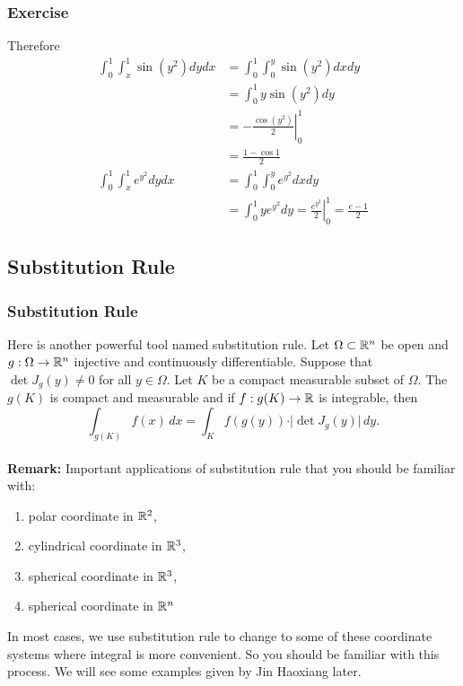 \documentclass[10pt, t]{beamer}
\newcommand{\nullspace}{~\\[15pt]}
\begin{document}
\begin{frame}
    \frametitle{Exercise}
    Therefore
    \[
        \begin{aligned}
            \int_{0}^{1} \int_{x}^{1} \sin \left(y^{2}\right) d y d x & =\int_{0}^{1} \int_{0}^{y} \sin \left(y^{2}\right) d x d y                            \\
                                                                      & =\int_{0}^{1} y \sin \left(y^{2}\right) d y                                           \\&=               -\left.\frac{\cos \left(y^{2}\right)}{2}\right|_{0} ^{1}\\&=\frac{1-\cos 1}{2}          \\
            \int_{0}^{1} \int_{x}^{1} e^{y^{2}} d y d x               & =\int_{0}^{1} \int_{0}^{y} e^{y^{2}} d x d y                                          \\
                                                                      & =\int_{0}^{1} y e^{y^{2}} d y=\left.\frac{e^{y^{2}}}{2}\right|_{0} ^{1}=\frac{e-1}{2}
        \end{aligned}
    \]


\end{frame}

\subsection{Substitution Rule}
\begin{frame}
    \frametitle{Substitution Rule}
    Here is another powerful tool named substitution rule. Let $\Omega\subset\mathbb{R}^n$ be open and $g:\Omega\to\mathbb{R}^n$ injective and continuously differentiable. Suppose that $\det J_g(y)\neq0$ for all $y\in\Omega$. Let $K$ be a compact measurable subset of $\Omega$. The $g(K)$ is compact and measurable and if $f:g(K)\to\mathbb{R}$ is integrable, then
    \[\int_{g(K)}f(x)\,dx=\int_Kf(g(y))\cdot
        \vert\det J_g(y)\vert\,dy.\]
    \nullspace
    \textbf{Remark:} Important applications of substitution rule that you should be familiar with:
    \begin{enumerate}
        \item polar coordinate in $\mathbb{R}^2$,
        \item cylindrical coordinate in $\mathbb{R}^3$,
        \item spherical coordinate in $\mathbb{R}^3$,
        \item spherical coordinate in $\mathbb{R}^n$
    \end{enumerate}
    In most cases, we use substitution rule to change to some of these coordinate systems where integral is more convenient. So you should be familiar with this process. We will see some examples given by Jin Haoxiang later.
\end{frame}
\end{document}
